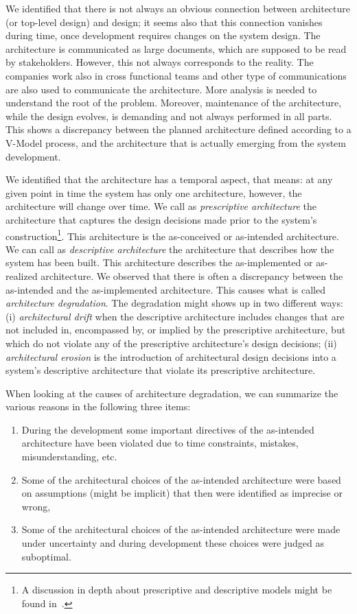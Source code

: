 We identified that there is not always an obvious connection between  
architecture (or top-level design) and  design; it seems also that this connection vanishes during time, once development requires changes on the system design. %
The architecture is communicated as large documents,
which are supposed to be read by stakeholders. However, this not always corresponds to the reality. The companies work also in cross functional teams and other type of communications are also used to communicate the architecture. More analysis is needed to understand the root of the problem. 
Moreover, maintenance of the
architecture, while the design evolves, is demanding and not
always performed in all parts. 
This shows a discrepancy between the planned architecture defined according to a V-Model process, and the architecture that is actually emerging from the system development. 

We identified that the architecture has a temporal aspect, that means: at any given point in time the system
has only one architecture, however, the architecture will change over time.
We call as {\em prescriptive architecture} the architecture that captures
the design decisions made prior to the system's construction\footnote{A discussion in depth about prescriptive and descriptive models might be found in~\cite{Models2016}.}. This architecture is the as-conceived or as-intended architecture.
We can call as {\em descriptive architecture} the architecture that describes how the system has been built. This architecture describes the as-implemented or as-realized architecture. We observed that there is often a discrepancy between the as-intended and the as-implemented architecture. This causes what is called {\em architecture degradation}. The degradation might shows up in two different ways: (i) {\em architectural drift} when the descriptive architecture includes changes that are not included in, encompassed by, or implied by the
prescriptive architecture, but which do not violate any of the prescriptive architecture's
design decisions; (ii) {\em architectural erosion} is the introduction of
architectural design decisions into a system's descriptive architecture that violate its prescriptive
architecture.
 
When looking at the causes of architecture degradation, we can summarize the various reasons in the following three items: 

\begin{enumerate} 
\item During the development some important directives of the as-intended architecture have been violated due to time constraints, mistakes, misunderstanding, etc. 
\item Some of the architectural choices of the as-intended architecture were based on assumptions (might be implicit) that then were identified as imprecise or wrong, 
\item Some of the architectural choices of the as-intended architecture were made under uncertainty and during development these choices were judged as suboptimal.
\end{enumerate}


